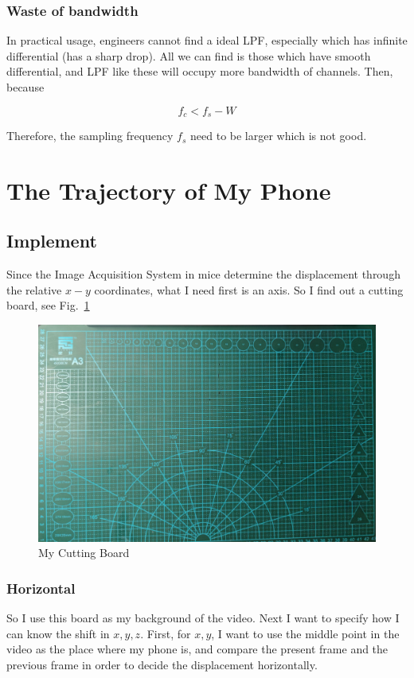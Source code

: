 \documentclass{article}
\begin{document}
\subsubsection{Waste of bandwidth}
In practical usage, engineers cannot find a ideal LPF, especially which has infinite differential (has a sharp drop). All we can find is those which have smooth differential, and LPF like these will occupy more bandwidth of channels. Then, because

$$
f_c < f_s - W
$$

Therefore, the sampling frequency $f_s$ need to be larger which is not good.

\section{The Trajectory of My Phone}

\subsection{Implement}
Since the Image Acquisition System in mice determine the displacement through the relative $x-y$ coordinates, what I need first is an axis. So I find out a cutting board, see Fig.~\ref{fig:cuttingBoard}

\begin{figure}[!h]
	\centering
	\includegraphics[width=3 in]{../pic/cuttingBoard.jpg}
	\caption{My Cutting Board}
	\label{fig:cuttingBoard}
\end{figure}

\subsubsection{Horizontal}
So I use this board as my background of the video. Next I want to specify how I can know the shift in $x, y, z$. First, for $x, y$, I want to use the middle point in the video as the place where my phone is, and compare the present frame and the previous frame in order to decide the displacement horizontally. 
\end{document}
